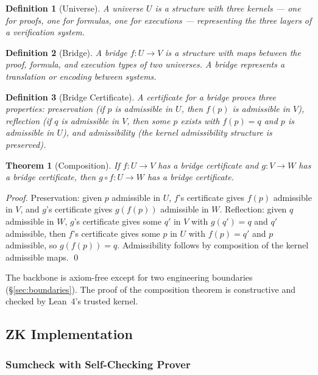 \documentclass[11pt,a4paper]{article}
\newtheorem{theorem}{Theorem}
\newtheorem{definition}{Definition}
\begin{document}
\begin{definition}[Universe]
A universe $U$ is a structure with three kernels --- one for proofs, one for formulas, one for executions --- representing the three layers of a verification system.
\end{definition}

\begin{definition}[Bridge]
A bridge $f: U \to V$ is a structure with maps between the proof, formula, and execution types of two universes. A bridge represents a translation or encoding between systems.
\end{definition}

\begin{definition}[Bridge Certificate]
A certificate for a bridge proves three properties: \emph{preservation} (if $p$ is admissible in $U$, then $f(p)$ is admissible in $V$), \emph{reflection} (if $q$ is admissible in $V$, then some $p$ exists with $f(p) = q$ and $p$ is admissible in $U$), and \emph{admissibility} (the kernel admissibility structure is preserved).
\end{definition}

\begin{theorem}[Composition]
\label{thm:composition}
If $f: U \to V$ has a bridge certificate and $g: V \to W$ has a bridge certificate, then $g \circ f: U \to W$ has a bridge certificate.
\end{theorem}

\begin{proof}
Preservation: given $p$ admissible in $U$, $f$'s certificate gives $f(p)$ admissible in $V$, and $g$'s certificate gives $g(f(p))$ admissible in $W$. Reflection: given $q$ admissible in $W$, $g$'s certificate gives some $q'$ in $V$ with $g(q') = q$ and $q'$ admissible, then $f$'s certificate gives some $p$ in $U$ with $f(p) = q'$ and $p$ admissible, so $g(f(p)) = q$. Admissibility follows by composition of the kernel admissible maps. \qed
\end{proof}

The backbone is axiom-free except for two engineering boundaries (\S\ref{sec:boundaries}). The proof of the composition theorem is constructive and checked by Lean~4's trusted kernel.

\subsection{ZK Implementation}
\label{sec:zk}

\subsubsection{Sumcheck with Self-Checking Prover}
\end{document}
